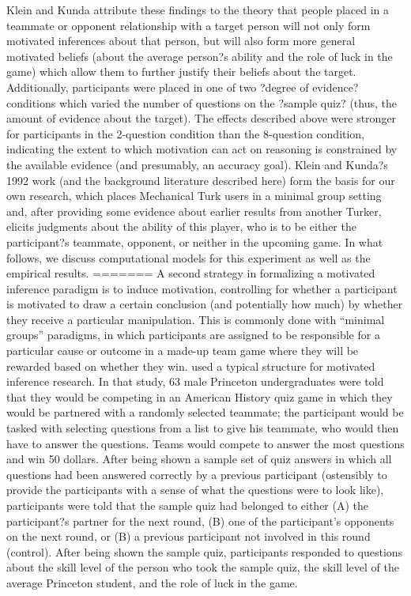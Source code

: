 \documentclass{article}
\begin{document}
Klein and Kunda attribute these findings to the theory that people placed in a teammate or opponent relationship with a target person will not only form motivated inferences about that person, but will also form more general motivated beliefs (about the average person?s ability and the role of luck in the game) which allow them to further justify their beliefs about the target. Additionally, participants were placed in one of two ?degree of evidence? conditions which varied the number of questions on the ?sample quiz? (thus, the amount of evidence about the target). The effects described above were stronger for participants in the 2-question condition than the 8-question condition, indicating the extent to which motivation can act on reasoning is constrained by the available evidence (and presumably, an accuracy goal). Klein and Kunda?s 1992 work (and the background literature described here) form the basis for our own research, which places Mechanical Turk users in a minimal group setting and, after providing some evidence about earlier results from another Turker, elicits judgments about the ability of this player, who is to be either the participant?s teammate, opponent, or neither in the upcoming game. In what follows, we discuss computational models for this experiment as well as the empirical results.
=======
A second strategy in formalizing a motivated inference paradigm is to induce motivation, controlling for whether a participant is motivated to draw a certain conclusion (and potentially how much) by whether they receive a particular manipulation. This is commonly done with ``minimal groups'' paradigms, in which participants are assigned to be responsible for a particular cause or outcome in a made-up team game where they will be rewarded based on whether they win. \citet{Klein1992} used a typical structure for motivated inference research. In that study, 63 male Princeton undergraduates were told that they would be competing in an American History quiz game in which they would be partnered with a randomly selected teammate; the participant would be tasked with selecting questions from a list to give his teammate, who would then have to answer the questions. Teams would compete to answer the most questions and win 50 dollars. After being shown a sample set of quiz answers in which all questions had been answered correctly by a previous participant (ostensibly to provide the participants with a sense of what the questions were to look like), participants were told that the sample quiz had belonged to either (A) the participant?s partner for the next round, (B) one of the participant's opponents on the next round, or (B) a previous participant not involved in this round (control). After being shown the sample quiz, participants responded to questions about the skill level of the person who took the sample quiz, the skill level of the average Princeton student, and the role of luck in the game. 
\end{document}

